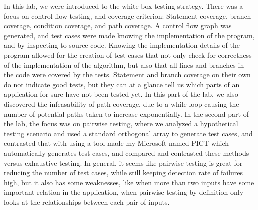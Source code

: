 In this lab, we were introduced to the white-box testing strategy. There was a
focus on control flow testing, and coverage criterion: Statement coverage,
branch coverage, condition coverage, and path coverage. A control flow graph
was generated, and test cases were made knowing the implementation of the
program, and by inspecting to source code. Knowing the implementation details
of the program allowed for the creation of test cases that not only check for
correctness of the implementation of the algorithm, but also that all lines and
branches in the code were covered by the tests. Statement and branch coverage on
their own do not indicate good tests, but they can at a glance tell us which
parts of an application for sure have not been tested yet. In this part of the
lab, we also discovered the infeasability of path coverage, due to a while loop
causing the number of potential paths taken to increase exponentially. In the
second part of
the lab, the focus was on pairwise testing, where we analyzed a hypothetical
testing scenario and used a standard orthogonal array to generate test cases,
and contrasted that with using a tool made my Microsoft named PICT which
automatically generates test cases, and compared and contrasted these methods
versus exhaustive testing. In general, it seems like pairwise testing is great
for reducing the number of test cases, while still keeping detection rate of
failures high, but it also has some weaknesses, like when more than two inputs
have some important relation in the application, when pairwise testing by
definition only looks at the relationships between each pair of inputs.
